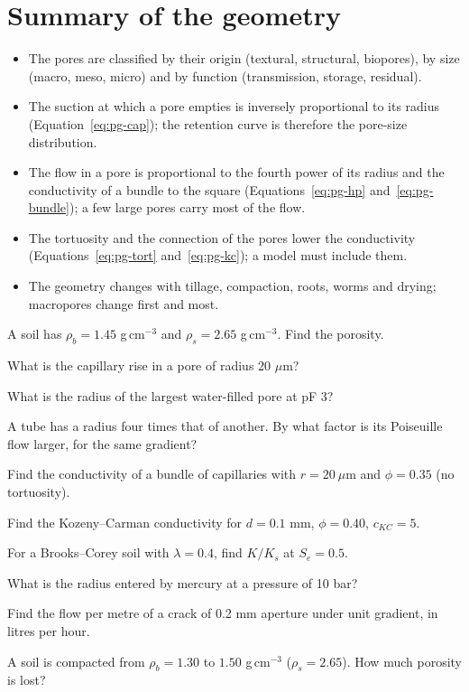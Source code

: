 \section{Summary of the geometry}
\begin{itemize}
\item The pores are classified by their origin (textural, structural, biopores), by size (macro, meso, micro) and by function (transmission, storage, residual).
\item The suction at which a pore empties is inversely proportional to its radius (Equation~\ref{eq:pg-cap}); the retention curve is therefore the pore-size distribution.
\item The flow in a pore is proportional to the fourth power of its radius and the conductivity of a bundle to the square (Equations~\ref{eq:pg-hp} and~\ref{eq:pg-bundle}); a few large pores carry most of the flow.
\item The tortuosity and the connection of the pores lower the conductivity (Equations~\ref{eq:pg-tort} and~\ref{eq:pg-kc}); a model must include them.
\item The geometry changes with tillage, compaction, roots, worms and drying; macropores change first and most.
\end{itemize}

\begin{exlist}
\item A soil has $\rho_b=1.45$ g\,cm$^{-3}$ and $\rho_s=2.65$ g\,cm$^{-3}$. Find the porosity. 
\item What is the capillary rise in a pore of radius 20 $\mu$m? \exans{74.5 cm}
\item What is the radius of the largest water-filled pore at pF 3? 
\item A tube has a radius four times that of another. By what factor is its Poiseuille flow larger, for the same gradient? 
\item Find the conductivity of a bundle of capillaries with $r=20\ \mu$m and $\phi=0.35$ (no tortuosity). 
\item Find the Kozeny--Carman conductivity for $d=0.1$ mm, $\phi=0.40$, $c_{KC}=5$. 
\item For a Brooks--Corey soil with $\lambda=0.4$, find $K/K_s$ at $S_e=0.5$. 
\item What is the radius entered by mercury at a pressure of 10 bar? 
\item Find the flow per metre of a crack of 0.2 mm aperture under unit gradient, in litres per hour. 
\item A soil is compacted from $\rho_b=1.30$ to $1.50$ g\,cm$^{-3}$ ($\rho_s=2.65$). How much porosity is lost? 
\end{exlist}

